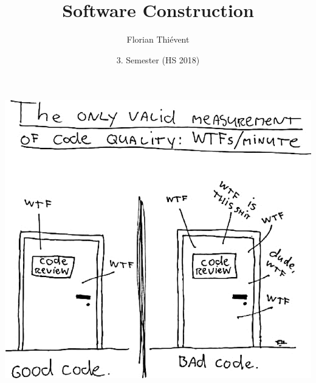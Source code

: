 \documentclass[10pt]{article}
\title{
	\vspace{2cm}
	\textbf{Software Construction}
}
\author{Florian Thiévent}
\date{3. Semester (HS 2018)}
\begin{document}
\maketitle
\begin{center}
\vspace{3cm}
	\includegraphics{assets/Titelbild.png}
\thispagestyle{fancy}
\end{center}

\newpage

\tableofcontents	  	


\newpage
\setcounter{page}{1}

\end{document}
